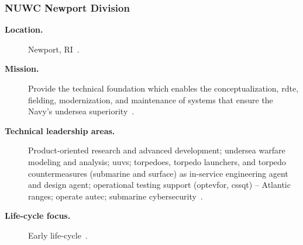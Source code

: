 \documentclass[../main.tex]{subfiles}
\begin{document}
\subsubsection{NUWC Newport Division}
\begin{description}
  \item[\textbf{Location.}] Newport, RI~\autocite{edo-2-1-4-warfare-centers-2024}.
  \item[\textbf{Mission.}] Provide the technical foundation which enables the conceptualization, \ac{rdte}, fielding, modernization, and maintenance of systems that ensure the Navy's undersea superiority~\autocite{edo-2-1-4-warfare-centers-2024}.
  \item[\textbf{Technical leadership areas.}] Product-oriented research and advanced development; undersea warfare modeling and analysis; \acp{uuv}; torpedoes, torpedo launchers, and torpedo countermeasures (submarine and surface) as in-service engineering agent and design agent; operational testing support (\ac{optevfor}, \ac{cssqt}) -- Atlantic ranges; operate \ac{autec}; submarine cybersecurity~\autocite{edo-2-1-4-warfare-centers-2024}.
  \item[\textbf{Life-cycle focus.}] Early life-cycle~\autocite{edo-2-1-4-warfare-centers-2024}.
\end{description}
\end{document}
